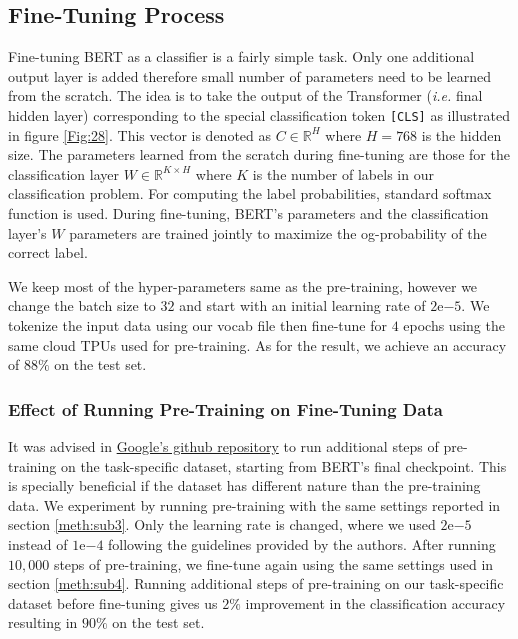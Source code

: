\subsection{Fine-Tuning Process}
\label{meth:s5_sub6}


Fine-tuning \ac{BERT} as a classifier is a fairly simple task. Only one additional output layer is added therefore small number of parameters need to be learned from the scratch. The idea is to take the output of the Transformer (\textit{i.e.} final hidden layer) corresponding to the special classification token \texttt{[CLS]} as illustrated in figure \ref{Fig:28}. This vector is denoted as $C \in {\mathbb{R}}^{H}$ where $H=768$ is the hidden size. The parameters learned from the scratch during fine-tuning are those for the classification layer $W \in {\mathbb{R}}^{K\times H} $ where $K$ is the number of labels in our classification problem. For computing the label probabilities, standard softmax function is used. During fine-tuning, \ac{BERT}'s parameters and the classification layer's $W$ parameters are trained jointly to maximize the og-probability of the correct label.

We keep most of the hyper-parameters same as the pre-training, however we change the batch size to $32$ and start with an initial learning rate of $2\mathrm{e}{-5}$. We tokenize the input data using our vocab file then fine-tune for $4$ epochs using the same cloud \ac{TPU}s used for pre-training. As for the result, we achieve an accuracy of $88\%$ on the test set.


\subsubsection{Effect of Running Pre-Training on Fine-Tuning Data}
\label{meth:s5_sub6_subsub1}

It was advised in \href{https://github.com/google-research/bert#pre-training-tips-and-caveats}{Google's github repository} to run additional steps of pre-training on the task-specific dataset, starting from \ac{BERT}'s final checkpoint. This is specially beneficial if the dataset has different nature than the pre-training data. We experiment by running pre-training with the same settings reported in section \ref{meth:sub3}. Only the learning rate is changed, where we used $2\mathrm{e}{-5}$ instead of $1\mathrm{e}{-4}$ following the guidelines provided by the authors. After running $10,000$ steps of pre-training, we fine-tune again using the same settings used in section \ref{meth:sub4}. Running additional steps of pre-training on our task-specific dataset before fine-tuning gives us $2\%$ improvement in the classification accuracy resulting in $90\%$ on the test set.
